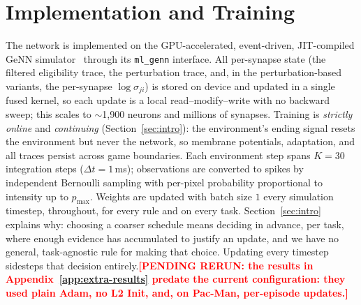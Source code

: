 \documentclass[10pt,twocolumn]{article}
\newcommand{\pending}[1]{\textcolor{red}{\bfseries[PENDING RERUN#1]}}
\begin{document}
\section{Implementation and Training}
\label{app:impl}
The network is implemented on the GPU-accelerated, event-driven, JIT-compiled
GeNN simulator~\citep{Yavuz2016GeNN} through its \texttt{ml\_genn} interface. All
per-synapse state (the filtered eligibility trace, the perturbation trace, and,
in the perturbation-based variants, the per-synapse $\log\sigma_{ji}$) is stored on
device and updated in a single fused kernel, so each update is a local
read--modify--write with no backward sweep; this scales to $\sim$1{,}900 neurons
and millions of synapses. Training is \emph{strictly online} and
\emph{continuing} (Section~\ref{sec:intro}): the environment's ending signal
resets the environment but never the network, so membrane potentials,
adaptation, and all traces persist across game boundaries. Each environment step
spans $K=30$ integration steps ($\Delta t = 1$\,ms); observations are converted
to spikes by independent Bernoulli sampling with per-pixel probability
proportional to intensity up to $p_{\max}$. Weights are updated with batch size
$1$ every simulation timestep, throughout, for every rule and on every task.
Section~\ref{sec:intro} explains why: choosing a coarser schedule means
deciding in advance, per task, where enough evidence has accumulated to
justify an update, and we have no general, task-agnostic rule for making that
choice. Updating every timestep sidesteps that decision
entirely.\pending{: the results in Appendix~\ref{app:extra-results} predate
the current configuration: they used plain Adam, no L2 Init, and, on Pac-Man,
per-episode updates.}
\end{document}
